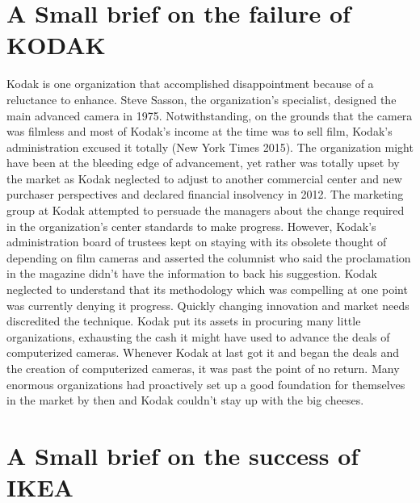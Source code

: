 \documentclass{article}
\begin{document}
\section{A Small brief on the failure of KODAK}

Kodak is one organization that accomplished disappointment because of a reluctance
to enhance. Steve Sasson, the organization's specialist, designed the main advanced
camera in 1975. Notwithstanding, on the grounds that the camera was filmless and
most of Kodak's income at the time was to sell film, Kodak's administration excused it
totally (New York Times 2015). The organization might have been at the bleeding edge
of advancement, yet rather was totally upset by the market as Kodak neglected to adjust
to another commercial center and new purchaser perspectives and declared financial
insolvency in 2012.
The marketing group at Kodak
attempted to persuade the managers
about the change required in the
organization's center standards to
make progress. However, Kodak's
administration board of trustees kept
on staying with its obsolete thought of
depending on film cameras and
asserted the columnist who said the
proclamation in the magazine didn't
have the information to back his
suggestion.
Kodak neglected to understand that its methodology which was compelling at one point
was currently denying it progress. Quickly changing innovation and market needs
discredited the technique. Kodak put its assets in procuring many little organizations,
exhausting the cash it might have used to advance the deals of computerized cameras.
Whenever Kodak at last got it and began the deals and the creation of computerized
cameras, it was past the point of no return. Many enormous organizations had proactively set up a good foundation for themselves in the market by then and Kodak
couldn't stay up with the big cheeses.

\section{ A Small brief on the success of IKEA}
\end{document}
